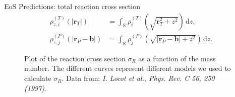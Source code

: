 \documentclass[serif]{beamer}
\newcommand{\bvec}[1]{\boldsymbol{#1}}%
\newcommand{\rb}[1]{\left(#1\right)}%
\newcommand{\abs}[1]{\left|#1\right|}%
\newcommand{\dd}{\,\mathrm{d}}%
\begin{document}
\begin{frame}{}
\begin{columns}[t]
\begin{column}{0.32\paperwidth}
\begin{block}{EoS Predictions: total reaction cross section}
\begin{subequations}
\begin{align}
\rho^{(T)}_{z,i}(\abs{\bvec{r}_T}) & = \int_{\mathbb{R}} \rho^{(T)}_i \rb{ \sqrt{  \bvec{r}_T^2 + z^2  } } \dd z, \\
\rho^{(P)}_{z,j}(\abs{\bvec{r}_P - \bvec{b}}) & = \int_{\mathbb{R}} \rho^{(P)}_j \rb{ \sqrt{  \abs{ \bvec{r}_P - \bvec{b} } + z^2  } } \dd z.
\end{align}
\label{eq:rho_ij}
\end{subequations}
\begin{figure}[H]
\begin{center}
\hspace{5cm}
\caption{Plot of the reaction cross section $\sigma_R$ as a function of the mass number. The different curves represent different models we used to calculate $\sigma_R$. Data from: \textit{I. Locot et al., Phys. Rev. C 56, 250 (1997)}.\label{ca_ar}}

\end{center}
\end{figure}
\end{block}
\end{column}
\end{columns}
\end{frame}
\end{document}
